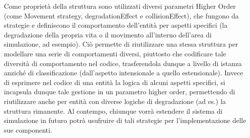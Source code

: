 Come proprietà della struttura sono utilizzati diversi parametri Higher Order (come Movement strategy, degradationEffect e collisionEffect), che fungono da strategie e definiscono il comportamento dell’entità per aspetti specifici (la degradazione della propria vita o il movimento all’interno dell’area di simulazione, ad esempio). Ciò permette di riutilizzare una stessa struttura per modellare una serie di comportamenti diversi, piuttosto che codificare tale diversità di comportamento nel codice, trasferendola dunque a livello di istanza anziché di classificazione (dall’aspetto intensionale a quello estensionale). Invece di esprimere nel codice di una entità la logica di alcuni aspetti specifici, si incapsula dunque tale gestione in un parametro higher order, permettendo di riutilizzare anche per entità con diverse logiche di degradazione (ad es.) la struttura rimanente. Al contempo, chiunque vorrà estendere il sistema di simulazione in futuro potrà usufruire di tali strategie per l’implementazione delle sue componenti.

